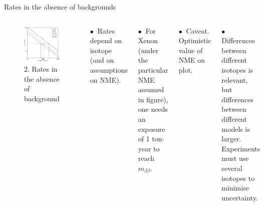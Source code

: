 \documentclass [aspectratio=169]{beamer}
\begin{document}
\begin{frame}{Rates in the absence of backgrounds}
\begin{columns}
\begin{figure}
\includegraphics[scale=0.43]{ratesbb0nu.png}
\caption{2. Rates in the absence of background}
\end{figure}

$\bullet~$ Rates depend on isotope (and on assumptions on NME). 

$\bullet~$ For Xenon (under the particular NME assumed in figure), one needs an exposure of 1 ton$\cdot$year to reach $m_{\beta\beta}$.

$\bullet~$ Caveat. Optimistic value of NME on plot.  

$\bullet~$ Differences between different isotopes is relevant, but differences between different models is larger. Experiments must use several isotopes to minimise uncertainty. 

\end{columns}
\end{frame}
\end{document}
